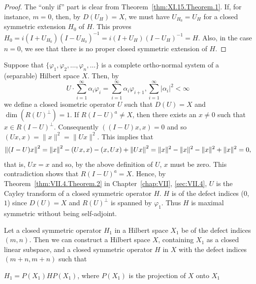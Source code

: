 \begin{proof}
 The ``only if'' part is clear from Theorem~\ref{thm:XI.15.Theorem.1}. If, for instance, $m = 0$, then, by $D(U_{H}) = X$, we must have $U_{H_{0}} = U_{H}$ for a closed symmetric extension $H_{0}$ of $H$. This proves $H_{0} = i(I + U_{H_{0}})(I - U_{H_{0}})^{-1} = i(I + U_{H})(I - U_{H})^{-1} = H$. Also, in the case $n = 0$, we see that there is no proper closed symmetric extension of $H$. 
\end{proof}

\begin{example}\label{ex:XI.15.Example.3} Suppose that $\{\varphi_1, \varphi_2, \ldots, \varphi_n, \ldots\}$ is a complete ortho-normal system of a (separable) Hilbert space $X$. Then, by 
\[
U \cdot \sum\limits_{i=1} ^{\infty} \alpha_{i} \varphi_{i} = \sum\limits_{i=1} ^{\infty} \alpha_{i} \varphi_{i+1}, \sum\limits_{i=1} ^{\infty} | \alpha_{i} | ^{2} < \infty
\]
we define a closed isometric operator $U$ such that $D(U) = X$ and $\dim (R(U)^\perp) = 1$. If $R(I - U)^a \neq X$, then there exists an $x \neq 0$ such that $x \in R(I - U)^\perp$. Consequently $((I - U)x, x) = 0$ and so $(Ux, x) = \|x\|^2 = \|Ux\|^2$. This implies that 
\begin{equation}\left\| (I - U) x \right\| ^{2} = \left\| x \right\| ^{2} - (U x, x) - (x, U x) + \left\| U x \right\| ^{2} = \| x \| ^{2} - \| x \| ^{2} - \| x \| ^{2} + \| x \| ^{2} = 0, \notag\end{equation}
that is, $Ux = x$ and so, by the above definition of $U$, $x$ must be zero. This contradiction shows that $R(I - U)^a = X$. Hence, by Theorem~\ref{thm:VII.4.Theorem.2} in Chapter~\ref{chap:VII}, \ref{sec:VII.4}, $U$ is the Cayley transform of a closed symmetric operator $H$. $H$ is of the defect indices ($0$, $1$) since $D(U) = X$ and $R(U)^\perp$ is spanned by $\varphi_1$. Thus $H$ is maximal symmetric without being self-adjoint. 
\end{example}

\begin{theorem}\label{thm:XI.15.Theorem.2} Let a closed symmetric operator $H_{1}$ in a Hilbert space $X_{1}$ be of the defect indices $(m, n)$. Then we can construct a Hilbert space $X$, containing $X_{1}$ as a closed linear subspace, and a closed symmetric operator $H$ in $X$ with the defect indices $(m + n, m + n)$ such that 

$H_{1} = P(X_{1})HP(X_{1})$, where $P(X_{1})$ is the projection of $X$ onto $X_{1}$ 
\end{theorem}

